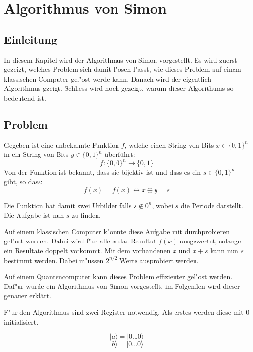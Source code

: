 \chapter{Algorithmus von Simon\label{chapter:simon}} 
\begin{refsection} 

\section{Einleitung} 

In diesem Kapitel wird der Algorithmus von Simon vorgestellt.  Es wird zuerst
gezeigt, welches Problem sich damit l"osen l"asst, wie dieses Problem auf einem
klassischen Computer gel"ost werde kann. Danach wird der eigentlich Algorithmus
gzeigt. Schliess wird noch gezeigt, warum dieser Algorithums so bedeutend ist.

\section{Problem} 

Gegeben ist eine unbekannte Funktion $f$, welche einen String
von Bits $x\in\{0,1\}^n$ in ein String von Bits $y\in\{0,1\}^n$ \"uberführt:
\[
    f\colon\{0,0\}^n\to\{0,1\} 
\]
Von der Funktion ist bekannt, dass sie bijektiv ist und dass es ein
$s\in\{0,1\}^n$ gibt, so dass: \[ f(x) = f(x) \leftrightarrow x \oplus y = s \]

Die Funktion hat damit zwei Urbilder falls $s \notin 0^n$, wobei $s$ die
Periode darstellt. Die Aufgabe ist nun $s$ zu finden.

Auf einem klassischen Computer k"onnte diese Aufgabe mit durchprobieren gel"ost
werden. Dabei wird f"ur alle $x$ das Resultut $f(x)$ ausgewertet, solange ein
Resultate doppelt vorkommt. Mit dem vorhandenen $x$ und $x + s$ kann nun $s$
bestimmt werden. Dabei m"ussen $2^{n/2}$ Werte ausprobiert werden.

 Auf einem Quantencomputer kann dieses Problem effizienter gel"ost werden.
Daf"ur wurde ein Algorithmus von Simon vorgestellt, im Folgenden wird dieser
genauer erklärt.


F"ur den Algorithmus sind zwei Register notwendig. Als erstes werden diese mit
0 initialisiert.

\[ 
    |a\rangle=|0 ... 0 \rangle 
\]
\[
    |b\rangle=|0 ... 0 \rangle 
\]


\end{refsection}
